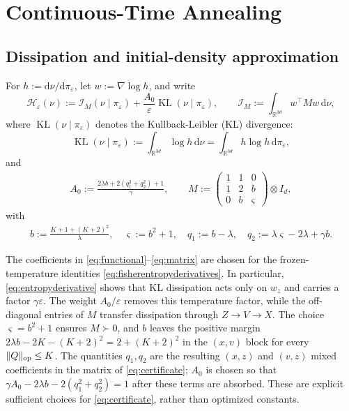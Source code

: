 \documentclass[11pt]{article}
\theoremstyle{definition}
\newcommand{\R}{\mathbb R}
\newcommand{\dd}{\mathrm d}
\newcommand{\KL}{\operatorname{KL}}
\newcommand{\Id}{I}
\newcommand{\cH}{\mathcal H}
\newcommand{\cI}{\mathcal I}
\newcommand{\eps}{\varepsilon}
\begin{document}
\section{Continuous-Time Annealing}\label{sec:continuous}

\subsection{Dissipation and initial-density approximation}
For $h:=\dd\nu/\dd\pi_\eps$, let $w:=\nabla\log h$, and write
\begin{equation}\label{eq:functional}
 \cH_\eps(\nu):=\cI_M(\nu\mid\pi_\eps)
                  +\frac{A_0}{\eps}\KL(\nu\mid\pi_\eps),
 \qquad \cI_M:=\int_{\R^{3d}} w^\top M w\,\dd\nu,
\end{equation}
where $\KL(\nu\mid\pi_\eps)$ denotes the Kullback-Leibler (KL) divergence:
\begin{equation*}
\KL(\nu\mid\pi_\eps)
:=\int_{\mathbb{R}^{3d}}\log h\,\dd\nu
=\int_{\mathbb{R}^{3d}}h\log h\,\dd\pi_\eps,
\end{equation*}
and
\begin{align}\label{eq:matrix}
A_0:=\frac{2\lambda b+2(q_1^2+q_2^2)+1}{\gamma},
\qquad
M:=\begin{pmatrix}1&1&0\\1&2&b\\0&b&\varsigma\end{pmatrix}\otimes\Id_d,
\end{align}
with
\begin{align}
 b:=\frac{K+1+(K+2)^2}{\lambda},
 \quad \varsigma:=b^2+1,
 \quad q_1:=b-\lambda,
 \quad q_2:=\lambda\varsigma-2\lambda+\gamma b.
\end{align}

The coefficients in \eqref{eq:functional}--\eqref{eq:matrix} are chosen for the
frozen-temperature identities \eqref{eq:fisherentropyderivatives}. In particular,
\eqref{eq:entropyderivative} shows that KL dissipation acts only on $w_z$ and
carries a factor $\gamma\eps$. The weight $A_0/\eps$ removes this temperature
factor, while the off-diagonal entries of $M$ transfer dissipation through
$Z\to V\to X$. The choice $\varsigma=b^2+1$ ensures $M\succ0$, and $b$ leaves the
positive margin $2\lambda b-2K-(K+2)^2=2+(K+2)^2$ in the $(x,v)$ block for
every $\|Q\|_{\rm op}\leq K$. The quantities $q_1,q_2$ are the resulting
$(x,z)$ and $(v,z)$ mixed coefficients in the matrix of
\eqref{eq:certificate}; $A_0$ is chosen so that
$\gamma A_0-2\lambda b-2(q_1^2+q_2^2)=1$ after these terms are absorbed.
These are explicit sufficient choices for \eqref{eq:certificate}, rather than
optimized constants.
\end{document}
